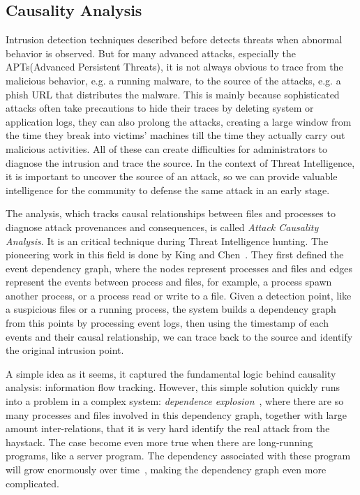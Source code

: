 \subsection{Causality Analysis}
Intrusion detection techniques described before detects threats 
when abnormal behavior is observed. But for many advanced 
attacks, especially the APTs(Advanced Persistent Threats), it 
is not always obvious to trace from the malicious behavior, e.g.
a running malware, to the source of the attacks, e.g. a phish 
URL that distributes the malware. This is mainly because sophisticated
attacks often take precautions to hide their traces by deleting
system or application logs, they can also prolong the attacks, 
creating a large window from the time they break into victims' 
machines till the time they actually carry out malicious activities. 
All of these can create difficulties for administrators to diagnose
the intrusion and trace the source. In the context of Threat 
Intelligence, it is important to uncover the source of 
an attack, so we can provide valuable intelligence for the community 
to defense the same attack in an early stage.

The analysis, which tracks causal relationships between files and 
processes to diagnose attack provenances and consequences, is called
\textit{Attack Causality Analysis}. It is an critical technique
during Threat Intelligence hunting. The pioneering work in this field
is done by King and Chen~\cite{king2003backtracking}. They first defined
the event dependency graph, where the nodes represent processes and files
and edges represent the events between process and files, for example,
a process spawn another process, or a process read or write to a 
file. Given a detection point, like a suspicious files or a running
process, the system builds a dependency graph from this points by
processing event logs, then using the timestamp of each events and 
their causal relationship, we can trace back to the source and identify
the original intrusion point.

A simple idea as it seems, it captured the fundamental logic behind 
causality analysis: information flow tracking. However, this simple
solution quickly runs into a problem in a complex system: 
\textit{dependence explosion}~\cite{goel2005taser}, where there are 
so many processes and files involved in this dependency graph, together
with large amount inter-relations, that it is very hard identify the
real attack from the haystack. The case become even more true when there
are long-running programs, like a server program. The dependency 
associated with these program will grow enormously over 
time~\cite{lee2013high}, making the dependency graph even more 
complicated.

